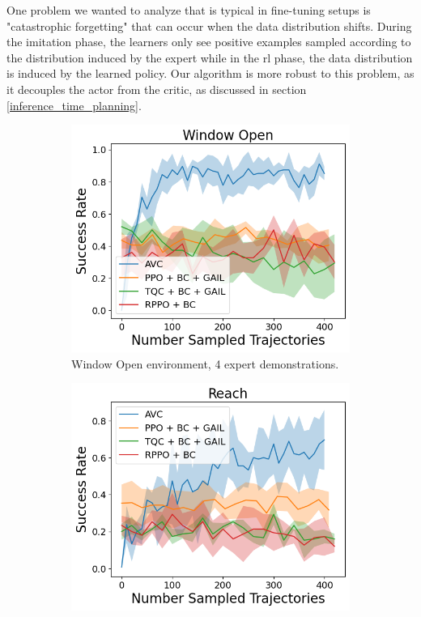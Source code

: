 One problem we wanted to analyze that is typical in fine-tuning setups 
is "catastrophic forgetting" 
that can occur when the data distribution shifts. During the imitation phase, the learners only see positive examples sampled according to 
the distribution induced by the expert while in the \ac{rl} phase, the data distribution is induced by the learned policy.
Our algorithm is more robust to this problem, as it 
decouples the actor from the critic, as discussed in section \ref{inference_time_planning}.\\ 

\begin{figure}[htbp]
  \centering
  \begin{subfigure}[t]{0.45\textwidth}
    \includegraphics[width=\textwidth]{images/4_400/Window Open.png}
    \caption{Window Open environment, 4 expert demonstrations.}
  \end{subfigure}
  \begin{subfigure}[t]{0.45\textwidth}
    \includegraphics[width=\textwidth]{images/4_400/Reach.png}

\end{subfigure}
\end{figure}
